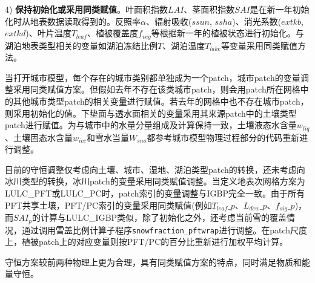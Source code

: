 4) \textbf{保持初始化或采用同类赋值}。叶面积指数$LAI$、茎面积指数$SAI$是在新一年初始化时从地表数据读取得到的。反照率$\alpha$、辐射吸收($ssun$, $ssha$)、消光系数($extkb$, $extkd$)、叶片温度$T_{leaf}$、植被覆盖度$f_{veg}$等根据新一年的植被状态进行初始化。与湖泊地表类型相关的变量如湖泊冻结比例$T$、湖泊温度$T_{lake}$等变量采用同类赋值方法。

当打开城市模型，每个存在的城市类别都单独成为一个patch，城市patch的变量调整采用同类赋值方案。但假如去年不存在该类城市patch，则会用patch所在网格中的其他城市类型patch的相关变量进行赋值。若去年的网格中也不存在城市patch，则采用初始化的值。下垫面与透水面相关的变量采用其来源patch中的土壤类型patch进行赋值。为与城市中的水量分量组成及计算保持一致，土壤液态水含量$w_{liq}$、土壤固态水含量$w_{ice}$和雪水当量$W_{sno}$都参考城市模型物理过程部分的代码重新进行调整。

目前的守恒调整仅考虑向土壤、城市、湿地、湖泊类型patch的转换，还未考虑向冰川类型的转换，冰川patch的变量采用同类赋值调整。当定义地表次网格方案为LULC\_PFT或LULC\_PC时，patch索引的变量调整与IGBP完全一致。由于所有PFT共享土壤，PFT/PC索引的变量采用同类赋值(例如$T_{leaf}\_p$、$L_{dew}\_p$、$f_{sig}\_p$)，而$SAI_p$的计算与LULC\_IGBP类似，除了初始化之外，还考虑当前雪的覆盖情况，通过调用雪盖比例计算子程序\texttt{snowfraction\_pftwrap}进行调整。在patch尺度上，植被patch上的对应变量则按PFT/PC的百分比重新进行加权平均计算。

守恒方案较前两种物理上更为合理，具有同类赋值方案的特点，同时满足物质和能量守恒。

